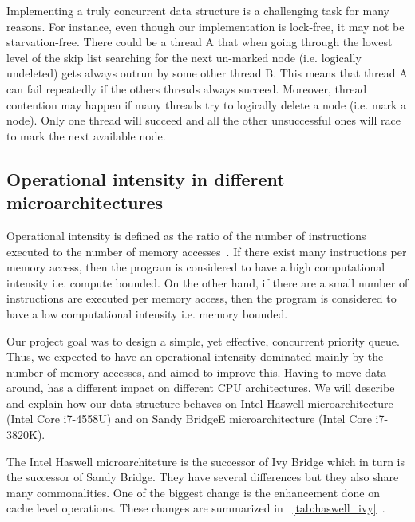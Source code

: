 Implementing a truly concurrent data structure is a challenging task for many reasons. For instance, even though our implementation is lock-free, it may not be starvation-free. There could be a thread A that when going through the lowest level of the skip list searching for the next un-marked node (i.e. logically undeleted) gets always outrun by some other thread B. This means that thread A can fail repeatedly if the others threads always succeed. Moreover, thread contention may happen if many threads try to logically delete a node (i.e. mark a node). Only one thread will succeed and all the other unsuccessful ones will race to mark
the next available node.\\


\subsection{Operational intensity in different microarchitectures}
Operational intensity is defined as the ratio of the number of instructions executed to the number of memory accesses~\cite{roger1996science}. If there exist many instructions per memory access, then the program is considered to have a high computational intensity i.e. compute bounded. On the other hand, if there are a small number of instructions are executed per memory access, then the program is considered to have a low computational intensity i.e. memory bounded.

Our project goal was to design a simple, yet effective, concurrent priority queue. Thus, we expected to have an operational intensity dominated mainly by the number of memory accesses, and aimed to improve this. Having to move data around, has a different impact on different CPU architectures. We will describe and explain how our data structure behaves on Intel Haswell microarchitecture (Intel Core i7-4558U) and on Sandy BridgeE microarchitecture (Intel Core i7-3820K). 

The Intel Haswell microarchiteture is the successor of Ivy Bridge which in turn is the successor of Sandy Bridge. They have several differences but they also share many commonalities. One of the biggest change is the enhancement done on cache level operations. These changes are summarized in \tablename~\ref{tab:haswell_ivy}~\cite{ijcsit2013040321, microarchitecture, haswell_arch}.


